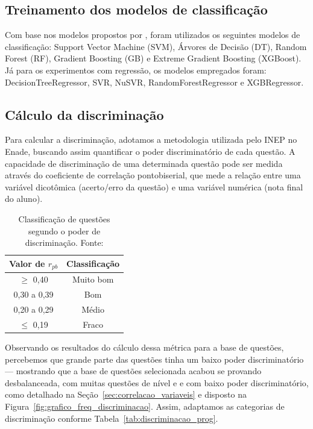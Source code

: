 \documentclass[12pt]{article}
\begin{document}
\subsection{Treinamento dos modelos de classificação}

Com base nos modelos propostos por \cite{jackson2023}, foram utilizados os seguintes modelos de classificação: Support Vector Machine (SVM), Árvores de Decisão (DT), Random Forest (RF), Gradient Boosting (GB) e Extreme Gradient Boosting (XGBoost). Já para os experimentos com regressão, os modelos empregados foram: DecisionTreeRegressor, SVR, NuSVR, RandomForestRegressor e XGBRegressor.

\subsection{Cálculo da discriminação}\label{sec:calculo_disc}

Para calcular a discriminação, adotamos a metodologia utilizada pelo INEP no Enade, buscando assim quantificar o poder discriminatório de cada questão. A capacidade de discriminação de uma determinada questão pode ser medida através do coeficiente de correlação pontobiserial, que mede a relação entre uma variável dicotômica (acerto/erro da questão) e uma variável numérica (nota final do aluno).

\begin{table}[h]
    \centering
\begin{small}    
    \caption{Classificação de questões segundo o poder de discriminação. Fonte: \cite{enade2021}}
    \label{tab:discriminacao_inep}
    \begin{tabular}{cc}
        \toprule
        \textbf{Valor de $r_{pb}$} & \textbf{Classificação} \\
        \toprule
        $\ge$ 0,40 & Muito bom \\
        0,30 a 0,39 & Bom \\
        0,20 a 0,29 & Médio \\
        $\le$ 0,19 & Fraco \\
        \bottomrule
    \end{tabular}
\end{small}
\end{table}

\noindent Observando os resultados do cálculo dessa métrica para a base de questões, percebemos que grande parte das questões tinha um baixo poder discriminatório --- mostrando que a base de questões selecionada acabou se provando desbalanceada, com muitas questões de nível  e  e com baixo poder discriminatório, como detalhado na Seção~\ref{sec:correlacao_variaveis} e disposto na Figura~\ref{fig:grafico_freq_discriminacao}. Assim, adaptamos as categorias de discriminação conforme Tabela~\ref{tab:discriminacao_prog}.
\end{document}
